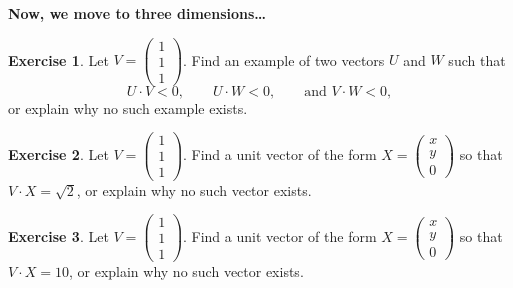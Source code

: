 \documentclass[11pt]{amsart}
\theoremstyle{definition}
\newtheorem{exercise}{Exercise}
\begin{document}
\textbf{Now, we move to three dimensions\dots}

\begin{exercise}
Let $V = \left(\begin{smallmatrix} 1 \\ 1 \\ 1 \end{smallmatrix}\right)$. Find an example of two vectors $U$ and $W$ such that
\begin{equation*}
U\cdot V < 0, \qquad U \cdot W < 0, \qquad \text{and } V \cdot W < 0,
\end{equation*}
or explain why no such example exists.
\end{exercise}

\begin{exercise}
Let $V = \left(\begin{smallmatrix} 1 \\ 1 \\ 1 \end{smallmatrix}\right)$. Find a unit vector of the form $X = \left(\begin{smallmatrix} x \\ y \\ 0 \end{smallmatrix}\right)$ so that $V \cdot X = \sqrt{2}$, or explain why no such vector exists.
\end{exercise}

\begin{exercise}
Let $V = \left(\begin{smallmatrix} 1 \\ 1 \\ 1 \end{smallmatrix}\right)$. Find a unit vector of the form $X = \left(\begin{smallmatrix} x \\ y \\ 0 \end{smallmatrix}\right)$ so that $V \cdot X = 10$, or explain why no such vector exists.
\end{exercise}
\end{document}
